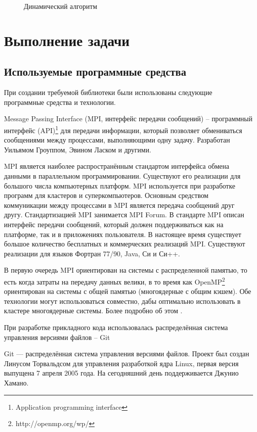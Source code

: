 \begin{figure}
\begin{small}

\end{small}
\caption{Динамический алгоритм}
\label{staticAndDinamic}
\end{figure}

\chapter{Выполнение задачи}
\section{Используемые программные средства}
При создании требуемой библиотеки были использованы следующие программные средства и технологии.   

Message Passing Interface (MPI, интерфейс передачи сообщений) -- программный интерфейс (API)\footnote{Application programming interface} для передачи информации, который позволяет обмениваться сообщениями между процессами, выполняющими одну задачу. Разработан Уильямом Гроуппом, Эвином Ласком и другими.

MPI является наиболее распространённым стандартом интерфейса обмена данными в параллельном программировании. Существуют его реализации для большого числа компьютерных платформ. MPI используется при разработке программ для кластеров и суперкомпьютеров. Основным средством коммуникации между процессами в MPI является передача сообщений друг другу. Стандартизацией MPI занимается MPI Forum. В стандарте MPI описан интерфейс передачи сообщений, который должен поддерживаться как на платформе, так и в приложениях пользователя. В настоящее время существует большое количество бесплатных и коммерческих реализаций MPI. Существуют реализации для языков Фортран 77/90, Java, Си и Си++.

В первую очередь MPI ориентирован на системы с распределенной памятью, то есть когда затраты на передачу данных велики, в то время как OpenMP\footnote{http://openmp.org/wp/} ориентирован на системы с общей памятью (многоядерные с общим кэшем). Обе технологии могут использоваться совместно, дабы оптимально использовать в кластере многоядерные системы. Более подробно об этом \cite{mpi:offsite}.

При разработке прикладного кода использовалась распределённая система управления версиями файлов -- Git

Git — распределённая система управления версиями файлов. Проект был создан Линусом Торвальдсом для управления разработкой ядра Linux, первая версия выпущена 7 апреля 2005 года. На сегодняшний день поддерживается Джунио Хамано.

